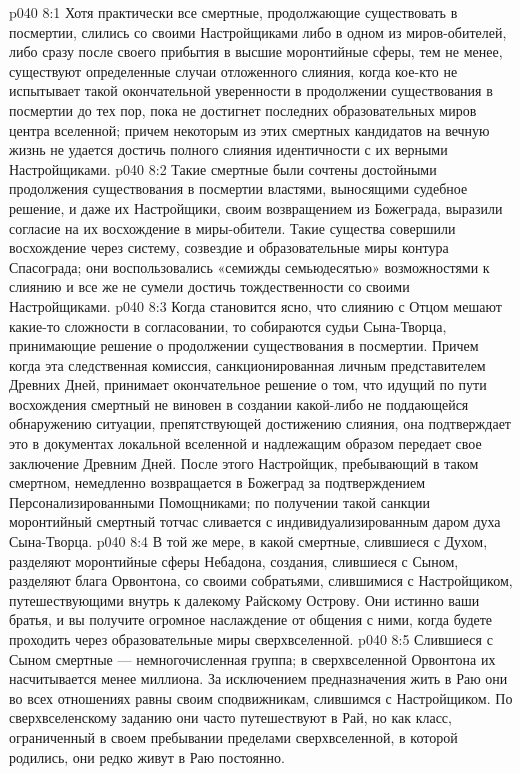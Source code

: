 \vs p040 8:1 Хотя практически все смертные, продолжающие существовать в посмертии, слились со своими Настройщиками либо в одном из миров\hyp{}обителей, либо сразу после своего прибытия в высшие моронтийные сферы, тем не менее, существуют определенные случаи отложенного слияния, когда кое\hyp{}кто не испытывает такой окончательной уверенности в продолжении существования в посмертии до тех пор, пока не достигнет последних образовательных миров центра вселенной; причем некоторым из этих смертных кандидатов на вечную жизнь не удается достичь полного слияния идентичности с их верными Настройщиками.
\vs p040 8:2 Такие смертные были сочтены достойными продолжения существования в посмертии властями, выносящими судебное решение, и даже их Настройщики, своим возвращением из Божеграда, выразили согласие на их восхождение в миры\hyp{}обители. Такие существа совершили восхождение через систему, созвездие и образовательные миры контура Спасограда; они воспользовались «семижды семьюдесятью» возможностями к слиянию и все же не сумели достичь тождественности со своими Настройщиками.
\vs p040 8:3 Когда становится ясно, что слиянию с Отцом мешают какие\hyp{}то сложности в согласовании, то собираются судьи Сына\hyp{}Творца, принимающие решение о продолжении существования в посмертии. Причем когда эта следственная комиссия, санкционированная личным представителем Древних Дней, принимает окончательное решение о том, что идущий по пути восхождения смертный не виновен в создании какой\hyp{}либо не поддающейся обнаружению ситуации, препятствующей достижению слияния, она подтверждает это в документах локальной вселенной и надлежащим образом передает свое заключение Древним Дней. После этого Настройщик, пребывающий в таком смертном, немедленно возвращается в Божеград за подтверждением Персонализированными Помощниками; по получении такой санкции моронтийный смертный тотчас сливается с индивидуализированным даром духа Сына\hyp{}Творца.
\vs p040 8:4 \pc В той же мере, в какой смертные, слившиеся с Духом, разделяют моронтийные сферы Небадона, создания, слившиеся с Сыном, разделяют блага Орвонтона, со своими собратьями, слившимися с Настройщиком, путешествующими внутрь к далекому Райскому Острову. Они истинно ваши братья, и вы получите огромное наслаждение от общения с ними, когда будете проходить через образовательные миры сверхвселенной.
\vs p040 8:5 Слившиеся с Сыном смертные --- немногочисленная группа; в сверхвселенной Орвонтона их насчитывается менее миллиона. За исключением предназначения жить в Раю они во всех отношениях равны своим сподвижникам, слившимся с Настройщиком. По сверхвселенскому заданию они часто путешествуют в Рай, но как класс, ограниченный в своем пребывании пределами сверхвселенной, в которой родились, они редко живут в Раю постоянно.
